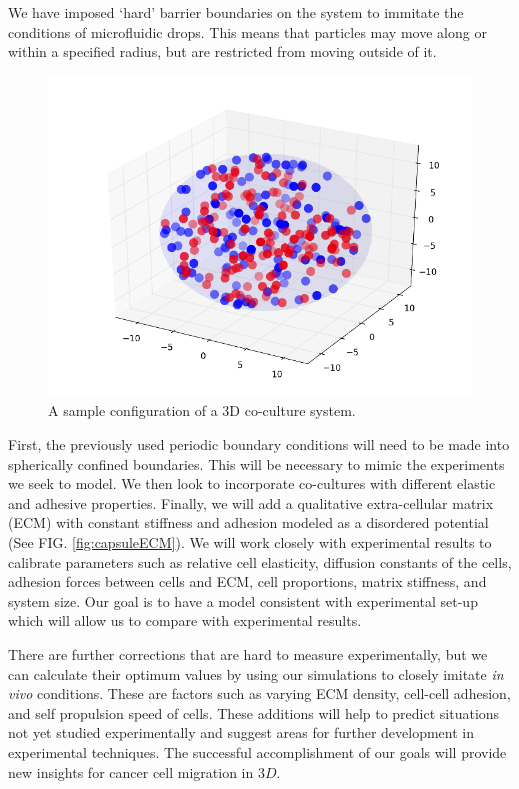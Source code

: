 \documentclass[aps,prb,twocolumn,groupedaddress,nofootinbib,floatfix]{revtex4}
\begin{document}
We have imposed `hard' barrier boundaries on the system to immitate the conditions of microfluidic drops. This means that particles may move along or within a specified radius, but are restricted from moving outside of it.

\begin{figure}
  \includegraphics[width=1.0\columnwidth]{3dconf.png}
  \caption[3dconf]
    { A sample configuration of a 3D co-culture system.}
   \label{fig:3dconf}
\end{figure}

First, the previously used periodic boundary conditions will need to be made into spherically confined boundaries.
This will be necessary to mimic the experiments we seek to model.
We then look to incorporate co-cultures with different elastic and adhesive properties. 
Finally, we will add a qualitative extra-cellular matrix (ECM) with constant stiffness and adhesion modeled as a disordered potential (See FIG. \ref{fig:capsuleECM}). 
We will work closely with experimental results to calibrate parameters such as relative cell elasticity, diffusion constants of the cells, adhesion forces between cells and ECM, cell proportions, matrix stiffness, and system size.
Our goal is to have a model consistent with experimental set-up which will allow us to compare with experimental results.

There are further corrections that are hard to measure experimentally, but we can calculate their optimum values by using our simulations to closely imitate {\it in vivo} conditions. 
These are factors such as varying ECM density, cell-cell adhesion, and self propulsion speed of cells.
These additions will help to predict situations not yet studied experimentally and suggest areas for further development in experimental techniques. The successful accomplishment of our goals will provide
new insights for cancer cell migration in $3D$.
\end{document}
